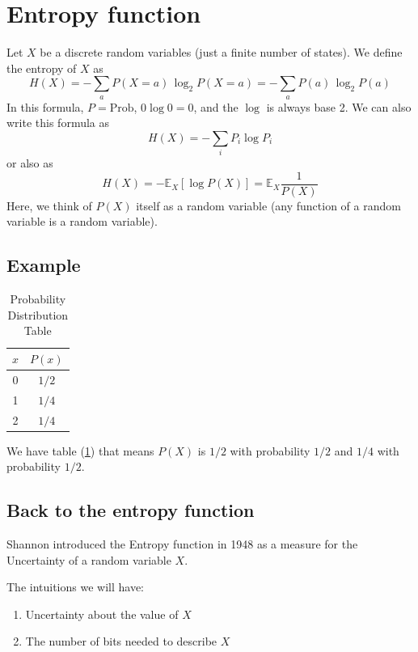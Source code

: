 \documentclass{article}
\begin{document}
\section{Entropy function}

Let $X$ be a discrete random variables (just a finite number of states). We define the entropy of $X$ as 
\begin{equation}
    H(X) = -\sum_{a} P(X=a)\, \log_2 P(X=a)=-\sum_{a} P(a)\, \log_2 P(a)
\end{equation}
In this formula, $P=\text{Prob}$, $0\log 0=0$, and the $\log$ is always base 2. We can also write this formula as 
\[
H(X) = -\sum_{i }P_i \log P_i
\]
or also as 
\[
H(X) = - \mathbb{E}_X\left[\log P(X)\right]=\mathbb{E}_X\frac{1 }{P(X)}
\]
Here, we think of $P(X)$ itself as a random variable (any function of a random variable is a random variable).

\subsection{Example}

\begin{table}[h]
\centering
\begin{tabular}{|c|c|}
\hline
$x$ & $P(x)$ \\ \hline
0   & $1/2$  \\ \hline
1   & $1/4$  \\ \hline
2   & $1/4$  \\ \hline
\end{tabular}
\caption{Probability Distribution Table}
\label{tab:prob_dist}
\end{table}

We have table (\ref{tab:prob_dist}) that means $P(X)$ is $1/2$ with probability $1/2$ and $1/4$ with probability $1/2$.

\subsection{Back to the entropy function}

Shannon introduced the Entropy function in 1948 as a measure for the Uncertainty of a random variable $X$.

The intuitions we will have:
\begin{enumerate}
    \item Uncertainty about the value of $X$
    \item The number of bits needed to describe $X$
\end{enumerate}
\end{document}
